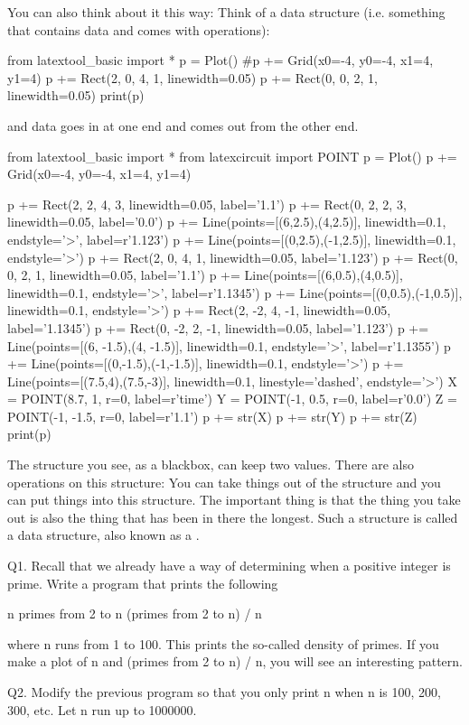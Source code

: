You can also think about it this way: Think of a data structure (i.e.
something that contains data and comes with operations):
\begin{python}
from latextool_basic import *
p = Plot()
#p += Grid(x0=-4, y0=-4, x1=4, y1=4)
p += Rect(2, 0, 4, 1, linewidth=0.05)
p += Rect(0, 0, 2, 1, linewidth=0.05)
print(p)
\end{python}
and data goes in at one end and comes out from the other end.
\begin{python}
from latextool_basic import *
from latexcircuit import POINT
p = Plot()
p += Grid(x0=-4, y0=-4, x1=4, y1=4)

p += Rect(2, 2, 4, 3, linewidth=0.05, label='1.1')
p += Rect(0, 2, 2, 3, linewidth=0.05, label='0.0')
p += Line(points=[(6,2.5),(4,2.5)], linewidth=0.1, endstyle='>', label=r'1.123')
p += Line(points=[(0,2.5),(-1,2.5)], linewidth=0.1, endstyle='>')
p += Rect(2, 0, 4, 1, linewidth=0.05, label='1.123')
p += Rect(0, 0, 2, 1, linewidth=0.05, label='1.1')
p += Line(points=[(6,0.5),(4,0.5)], linewidth=0.1, endstyle='>', label=r'1.1345')
p += Line(points=[(0,0.5),(-1,0.5)], linewidth=0.1, endstyle='>')
p += Rect(2, -2, 4, -1, linewidth=0.05, label='1.1345')
p += Rect(0, -2, 2, -1, linewidth=0.05, label='1.123')
p += Line(points=[(6, -1.5),(4, -1.5)], linewidth=0.1, endstyle='>', label=r'1.1355')
p += Line(points=[(0,-1.5),(-1,-1.5)], linewidth=0.1, endstyle='>')
p += Line(points=[(7.5,4),(7.5,-3)], linewidth=0.1, linestyle='dashed', endstyle='>')
X = POINT(8.7, 1, r=0, label=r'time')
Y = POINT(-1, 0.5, r=0, label=r'0.0')
Z = POINT(-1, -1.5, r=0, label=r'1.1')
p += str(X)
p += str(Y)
p += str(Z)
print(p)
\end{python}
The structure you see, as a blackbox, can keep two values. There are
also operations on this structure: You can take things out of the
structure and you can put things into this structure. The important
thing is that the thing you take out is also the thing that has been in
there the longest. Such a structure is called a
 data structure, also known as a
.

\newpage{}

Q1. Recall that we already have a way of determining when a positive
integer is prime. Write a program that prints the following
\begin{center}
n primes from 2 to n (primes from 2 to n) / n
\end{center}
where n runs from 1 to 100. This prints the so-called density of primes.
If you make a plot of n and (primes from 2 to n) / n, you will see an
interesting pattern.

Q2. Modify the previous program so that you only print n when n is 100,
200, 300, etc. Let n run up to 1000000.
